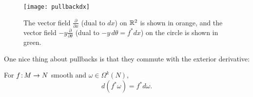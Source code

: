 \begin{example}
	\begin{figure}[htbp]
		\centering
			\texttt{[image: pullbackdx]}
		\caption{The vector field $\frac{\partial}{\partial x}$ (dual to $dx$) on $\mathbb{R}^2$ is shown in orange, and the vector field $-y \frac{\partial}{\partial \theta}$ (dual to $-y\, d\theta = f^\ast dx$) on the circle is shown in green.}
		\label{fig:pullback dx}
	\end{figure}
\end{example}

One nice thing about pullbacks is that they commute with the exterior derivative:

\begin{proposition}\label{prop:pullbacks commute with exterior derivative}
	For $f \colon\thinspace\!\! M \to N$ smooth and $\omega \in \Omega^k(N)$,
	\[
		d(f^\ast \omega) = f^\ast d\omega.
	\]
\end{proposition}

